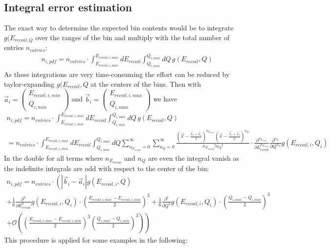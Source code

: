\subsection{Integral error estimation}
The exact way to determine the expected bin contents would be to integrate $g(E_{recoil,Q}$ over the ranges of the bin and multiply with the total number of entries $n_{entries}$:
\begin{gather}
n_{i,pdf} = n_{entries} \cdot \int_{E_{recoil,i,min}}^{E_{recoil,i,max}} dE_{recoil} \int_{Q_{i,min}}^{Q_{i,max}} dQ \, g(E_{recoil},Q)
\end{gather}
As these integrations are very time-consuming the effort can be reduced by taylor-expanding $g(E_{recoil},Q$ at the centers of the bins.
Then with $\vec{a}_i = \begin{pmatrix} E_{recoil,i,min} \\ Q_{i,min} \end{pmatrix}$ and $\vec{b}_i = \begin{pmatrix} E_{recoil,i,max} \\ Q_{i,max} \end{pmatrix}$ we have
\begin{gather}
n_{i,pdf} = n_{entries} \cdot \int_{E_{recoil,i,min}}^{E_{recoil,i,max}} dE_{recoil} \int_{Q_{i,min}}^{Q_{i,max}} dQ \, g(E_{recoil},Q) \\
 = n_{entries} \cdot \int_{E_{recoil,i,min}}^{E_{recoil,i,max}} dE_{recoil} \int_{Q_{i,min}}^{Q_{i,max}} dQ \sum_{n_{E_{recoil}} = 0}^\infty \sum_{n_{Q} = 0}^\infty
\frac{\left( \vec{x} - \frac{\vec{b}_i + \vec{a}_i}{2} \right)^{n_{E_{recoil}}} \left( \vec{x} - \frac{\vec{b}_i + \vec{a}_i}{2} \right)^{n_{Q}}}{n_{E_{recoil}}! n_Q!}
\cdot \frac{\partial^{n_{E_{recoil}}}}{\partial E_{recoil} ^{n_{E_{recoil}}}} \frac{\partial^{n_{Q}}}{\partial Q^{n_{Q}}} g(E_{recoil,i},Q_i)
\end{gather}
In the double for all terms where $n_{E_{recoil}}$ and $n_{Q}$ are even the integral vanish as the indefinite integrals are odd with respect to the center of the bin:
\begin{gather}
n_{i,pdf} = n_{entries} \cdot \left(  \left| \vec{b}_i - \vec{a}_i \right| g(E_{recoil,i},Q) \right. \\
+ \frac{1}{6} \frac{\partial^2}{\partial E_{recoil}^2} g(E_{recoil,i},Q_i) \cdot \left( \frac{E_{recoil,i,max} - E_{recoil,i,min}}{2} \right)^3 
+ \frac{1}{6} \frac{\partial^2}{\partial Q^2} g(E_{recoil,i},Q_i) \cdot \left( \frac{Q_{i,max} - Q_{i,min}}{2} \right)^3  \\
+ \left. \mathcal O \left( \left( \frac{E_{recoil,i,max} - E_{recoil,i,min}}{2} \right)^3 \left( \frac{Q_{i,max} - Q_{i,min}}{2} \right)^3 \right) \right)
\end{gather}
This procedure is applied for some examples in the following: \\[0.5cm]
